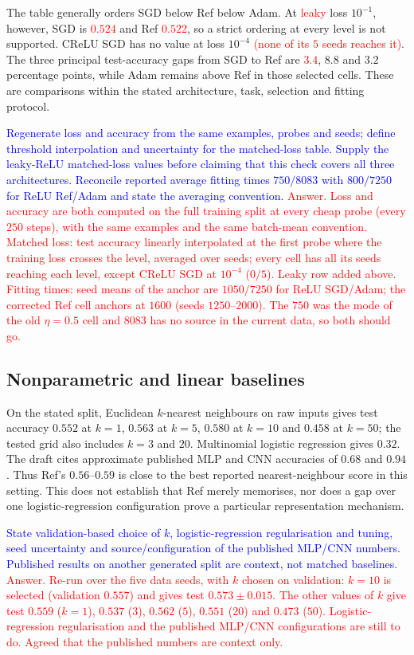 \documentclass{article}
\newcommand{\zied}[1]{\textcolor{blue}{#1}}
\newcommand{\nat}[1]{\textcolor{red}{#1}}
\theoremstyle{definition}
\theoremstyle{remark}
\begin{document}
The table generally orders SGD below Ref below Adam. At \nat{leaky} loss $10^{-1}$, however, SGD is \nat{$0.524$} and Ref \nat{$0.522$}, so a strict ordering at every level is not supported. CReLU SGD has no value at loss $10^{-4}$ \nat{(none of its $5$ seeds reaches it)}. The three principal test-accuracy gaps from SGD to Ref are \nat{$3.4$}, $8.8$ and $3.2$ percentage points, while Adam remains above Ref in those selected cells. These are comparisons within the stated architecture, task, selection and fitting protocol.

\zied{Regenerate loss and accuracy from the same examples, probes and seeds; define threshold interpolation and uncertainty for the matched-loss table. Supply the leaky-ReLU matched-loss values before claiming that this check covers all three architectures. Reconcile reported average fitting times $750/8083$ with $800/7250$ for ReLU Ref/Adam and state the averaging convention.}
\nat{Answer. Loss and accuracy are both computed on the full training split at every cheap probe (every $250$ steps), with the same examples and the same batch-mean convention. Matched loss: test accuracy linearly interpolated at the first probe where the training loss crosses the level, averaged over seeds; every cell has all its seeds reaching each level, except CReLU SGD at $10^{-4}$ ($0/5$). Leaky row added above. Fitting times: seed means of the anchor are $1050/7250$ for ReLU SGD/Adam; the corrected Ref cell anchors at $1600$ (seeds $1250$--$2000$). The $750$ was the mode of the old $\eta=0.5$ cell and $8083$ has no source in the current data, so both should go.}

\subsection{Nonparametric and linear baselines}\label{app:e6}

On the stated split, Euclidean $k$-nearest neighbours on raw inputs gives test accuracy $0.552$ at $k=1$, $0.563$ at $k=5$, $0.580$ at $k=10$ and $0.458$ at $k=50$; the tested grid also includes $k=3$ and $20$. Multinomial logistic regression gives $0.32$. The draft cites approximate published MLP and CNN accuracies of $0.68$ and $0.94$. Thus Ref's $0.56$--$0.59$ is close to the best reported nearest-neighbour score in this setting. This does not establish that Ref merely memorises, nor does a gap over one logistic-regression configuration prove a particular representation mechanism.

\zied{State validation-based choice of $k$, logistic-regression regularisation and tuning, seed uncertainty and source/configuration of the published MLP/CNN numbers. Published results on another generated split are context, not matched baselines.}
\nat{Answer. Re-run over the five data seeds, with $k$ chosen on validation: $k=10$ is selected (validation $0.557$) and gives test $0.573\pm0.015$. The other values of $k$ give test $0.559$ ($k=1$), $0.537$ ($3$), $0.562$ ($5$), $0.551$ ($20$) and $0.473$ ($50$). Logistic-regression regularisation and the published MLP/CNN configurations are still to do. Agreed that the published numbers are context only.}
\end{document}
